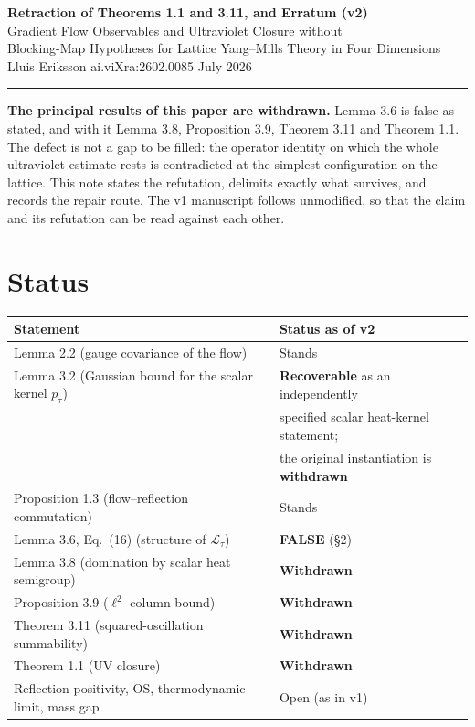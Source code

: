 \documentclass[11pt]{article}
\begin{document}
\begin{center}
{\Large\bfseries Retraction of Theorems 1.1 and 3.11, and Erratum (v2)}\\[5pt]
{\large Gradient Flow Observables and Ultraviolet Closure without\\
Blocking-Map Hypotheses for Lattice Yang--Mills Theory in Four Dimensions}\\[6pt]
Lluis Eriksson \quad\textbullet\quad ai.viXra:2602.0085 \quad\textbullet\quad July 2026
\end{center}

\noindent\rule{\textwidth}{0.8pt}

\vspace{2pt}
\noindent
\textbf{The principal results of this paper are withdrawn.} Lemma 3.6 is false as
stated, and with it Lemma 3.8, Proposition 3.9, Theorem 3.11 and Theorem 1.1. The
defect is not a gap to be filled: the operator identity on which the whole
ultraviolet estimate rests is contradicted at the simplest configuration on the
lattice. This note states the refutation, delimits exactly what survives, and
records the repair route. The v1 manuscript follows unmodified, so that the claim
and its refutation can be read against each other.

\section{Status}

\begin{center}
\begin{tabularx}{\textwidth}{|>{\raggedright\arraybackslash}p{}|X|}
\hline
\textbf{Statement} & \textbf{Status as of v2}\\
\hline
Lemma 2.2 (gauge covariance of the flow) & Stands\\
\hline
Lemma 3.2 (Gaussian bound for the scalar kernel $p_\tau$)
 & \textbf{Recoverable} as an independently\\
 & specified scalar heat-kernel statement;\\
 & the original instantiation is \textbf{withdrawn}\\
\hline
Proposition 1.3 (flow--reflection commutation) & Stands\\
\hline
Lemma 3.6, Eq.~(16) (structure of $\mathcal L_\tau$) & \textbf{FALSE} (\S2)\\
\hline
Lemma 3.8 (domination by scalar heat semigroup) & \textbf{Withdrawn}\\
\hline
Proposition 3.9 ($\ell^2$ column bound) & \textbf{Withdrawn}\\
\hline
Theorem 3.11 (squared-oscillation summability) & \textbf{Withdrawn}\\
\hline
Theorem 1.1 (UV closure) & \textbf{Withdrawn}\\
\hline
Reflection positivity, OS, thermodynamic limit, mass gap & Open (as in v1)\\
\hline
\end{tabularx}
\end{center}
\end{document}
